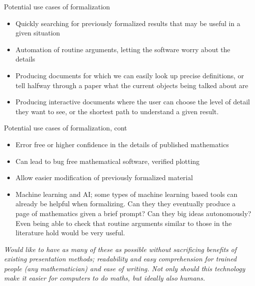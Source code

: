 \documentclass{beamer}
\theoremstyle{plain}
\begin{document}

\begin{frame}{Potential use cases of formalization}
    \begin{itemize}
    \item Quickly searching for previously formalized results that may be useful in a given situation
    \item Automation of routine arguments, letting the software worry about the details

    \item Producing documents for which we can easily look up precise definitions, or tell halfway through a paper what the current objects being talked about are

    \item Producing interactive documents where the user can choose the level of detail they want to see, or the shortest path to understand a given result.
    \end{itemize}

\end{frame}
\begin{frame}{Potential use cases of formalization, cont}

    \begin{itemize}
    \item Error free or higher confidence in the details of published mathematics

    \item Can lead to bug free mathematical software, verified plotting
    \item Allow easier modification of previously formalized material

    \item
        Machine learning and AI; some types of machine learning based tools can already be helpful when formalizing.
        Can they they eventually produce a page of mathematics given a brief prompt? Can they big ideas autonomously? Even being able to check that routine arguments similar to those in the literature hold would be very useful.
    \end{itemize}

    \emph{Would like to have as many of these as possible without sacrificing benefits of existing presentation methods; readability and easy comprehension for trained people (any mathematician) and ease of writing.
    Not only should this technology make it easier for computers to do maths, but ideally also humans.}
\end{frame}
\end{document}

